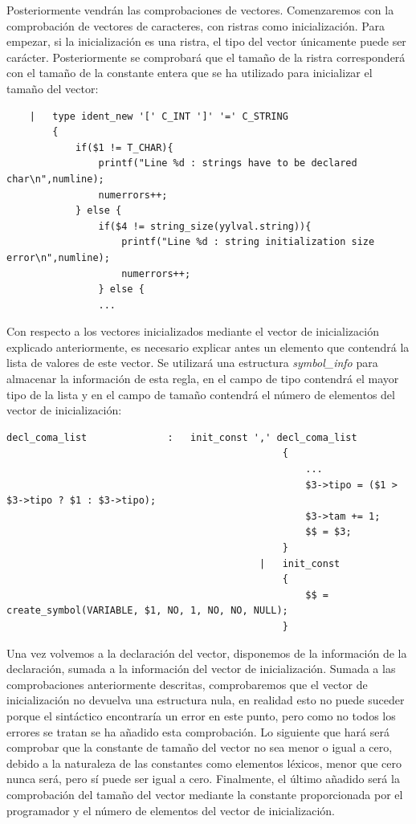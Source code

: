 \documentclass[a4paper,10pt]{article}
\begin{document}
Posteriormente vendrán las comprobaciones de vectores. Comenzaremos con la comprobación de vectores de caracteres, con ristras como inicialización. Para empezar, si la inicialización es una ristra, el tipo del vector únicamente puede ser carácter. Posteriormente se comprobará que el tamaño de la ristra corresponderá con el tamaño de la constante entera que se ha utilizado para inicializar el tamaño del vector:

\begin{lstlisting}
	|	type ident_new '[' C_INT ']' '=' C_STRING  
		{
			if($1 != T_CHAR){
				printf("Line %d : strings have to be declared char\n",numline);
				numerrors++;
			} else {
				if($4 != string_size(yylval.string)){
					printf("Line %d : string initialization size error\n",numline);
					numerrors++;
				} else {
				...
\end{lstlisting}

Con respecto a los vectores inicializados mediante el vector de inicialización explicado anteriormente, es necesario explicar antes un elemento que contendrá la lista de valores de este vector. Se utilizará una estructura \textit{symbol\_info} para almacenar la información de esta regla, en el campo de tipo contendrá el mayor tipo de la lista y en el campo de tamaño contendrá el número de elementos del vector de inicialización:

\begin{lstlisting}
decl_coma_list				:	init_const ',' decl_coma_list 
												{
													...
													$3->tipo = ($1 > $3->tipo ? $1 : $3->tipo);
													$3->tam += 1;
													$$ = $3;
												}
											|	init_const 
												{
													$$ = create_symbol(VARIABLE, $1, NO, 1, NO, NO, NULL);
												}
\end{lstlisting}

Una vez volvemos a la declaración del vector, disponemos de la información de la declaración, sumada a la información del vector de inicialización. Sumada a las comprobaciones anteriormente descritas, comprobaremos que el vector de inicialización no devuelva una estructura nula, en realidad esto no puede suceder porque el sintáctico encontraría un error en este punto, pero como no todos los errores se tratan se ha añadido esta comprobación. Lo siguiente que hará será comprobar que la constante de tamaño del vector no sea menor o igual a cero, debido a la naturaleza de las constantes como elementos léxicos, menor que cero nunca será, pero sí puede ser igual a cero. Finalmente, el último añadido será la comprobación del tamaño del vector mediante la constante proporcionada por el programador y el número de elementos del vector de inicialización.
\end{document}
